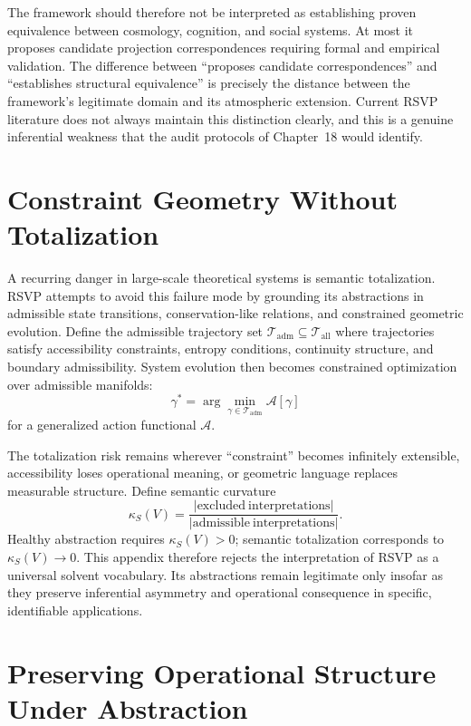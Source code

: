 \documentclass[12pt, openright, twoside]{book}
\begin{document}
The framework should therefore not be interpreted as establishing proven
equivalence between cosmology, cognition, and social systems. At most it
proposes candidate projection correspondences requiring formal and empirical
validation. The difference between ``proposes candidate correspondences''
and ``establishes structural equivalence'' is precisely the distance between
the framework's legitimate domain and its atmospheric extension. Current
RSVP literature does not always maintain this distinction clearly, and
this is a genuine inferential weakness that the audit protocols of
Chapter~18 would identify.

\section{Constraint Geometry Without Totalization}

A recurring danger in large-scale theoretical systems is semantic
totalization. RSVP attempts to avoid this failure mode by grounding its
abstractions in admissible state transitions, conservation-like relations,
and constrained geometric evolution. Define the admissible trajectory set
$\mathcal{T}_{\mathrm{adm}} \subseteq \mathcal{T}_{\mathrm{all}}$ where
trajectories satisfy accessibility constraints, entropy conditions,
continuity structure, and boundary admissibility. System evolution then
becomes constrained optimization over admissible manifolds:
\[
\gamma^*
= \arg\min_{\gamma \in \mathcal{T}_{\mathrm{adm}}} \mathcal{A}[\gamma]
\]
for a generalized action functional $\mathcal{A}$.

The totalization risk remains wherever ``constraint'' becomes infinitely
extensible, accessibility loses operational meaning, or geometric language
replaces measurable structure. Define semantic curvature
\[
\kappa_S(V)
= \frac{|\mathrm{excluded\ interpretations}|}
       {|\mathrm{admissible\ interpretations}|}.
\]
Healthy abstraction requires $\kappa_S(V) > 0$; semantic totalization
corresponds to $\kappa_S(V) \to 0$. This appendix therefore rejects the
interpretation of RSVP as a universal solvent vocabulary. Its abstractions
remain legitimate only insofar as they preserve inferential asymmetry
and operational consequence in specific, identifiable applications.

\section{Preserving Operational Structure Under Abstraction}
\end{document}
